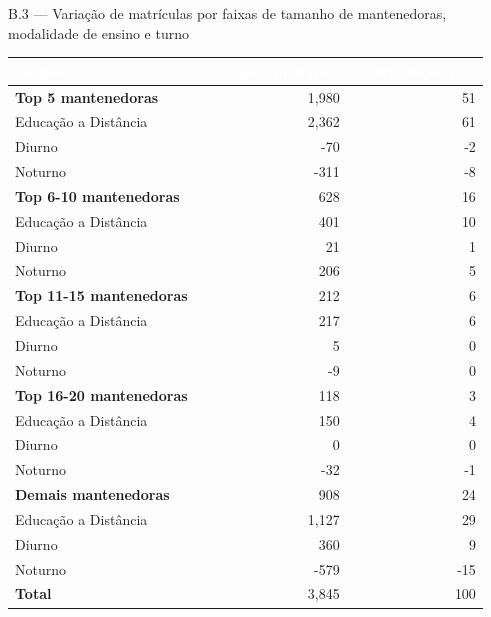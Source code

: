 \documentclass[
  12pt,
  ignorenonframetext,
  aspectratio=169,
  brazilian,
  t]{beamer}
\newcommand{\TituloGrafico}[1]{{\fontsize{17.5}{21}\selectfont #1}}
\begin{document}
\begin{frame}{\TituloGrafico{B.3 --- Variação de matrículas por faixas de tamanho de mantenedoras,
modalidade de ensino e turno}}
\protect{}\label{b.3-variauxe7uxe3o-de-matruxedculas-por-faixas-de-tamanho-de-mantenedoras-modalidade-de-ensino-e-turno}
\begin{center}\begingroup\fontsize{10}{11.5}\selectfont

\begin{tabular}{p{}rr}
\toprule
\rowcolor{azulescuro}
\textcolor{white}{\textbf{Grupos}} & \textcolor{white}{\textbf{Variação (milhares)}} & \textcolor{white}{\textbf{Contribuição (\%)}}\\
\midrule
\rowcolor{cinzaclaro}\textbf{Top 5 mantenedoras} & 1,980 & 51\\
\hspace{1em}Educação a Distância & 2,362 & 61\\
\hspace{1em}Diurno & -70 & -2\\
\hspace{1em}Noturno & -311 & -8\\
\rowcolor{cinzaclaro}\textbf{Top 6-10 mantenedoras} & 628 & 16\\
\hspace{1em}Educação a Distância & 401 & 10\\
\hspace{1em}Diurno & 21 & 1\\
\hspace{1em}Noturno & 206 & 5\\
\rowcolor{cinzaclaro}\textbf{Top 11-15 mantenedoras} & 212 & 6\\
\hspace{1em}Educação a Distância & 217 & 6\\
\hspace{1em}Diurno & 5 & 0\\
\hspace{1em}Noturno & -9 & 0\\
\rowcolor{cinzaclaro}\textbf{Top 16-20 mantenedoras} & 118 & 3\\
\hspace{1em}Educação a Distância & 150 & 4\\
\hspace{1em}Diurno & 0 & 0\\
\hspace{1em}Noturno & -32 & -1\\
\rowcolor{cinzaclaro}\textbf{Demais mantenedoras} & 908 & 24\\
\hspace{1em}Educação a Distância & 1,127 & 29\\
\hspace{1em}Diurno & 360 & 9\\
\hspace{1em}Noturno & -579 & -15\\
\rowcolor{cinzaclaro}\textbf{Total} & 3,845 & 100\\
\bottomrule
\end{tabular}
\endgroup\end{center}


\end{frame}
\end{document}
